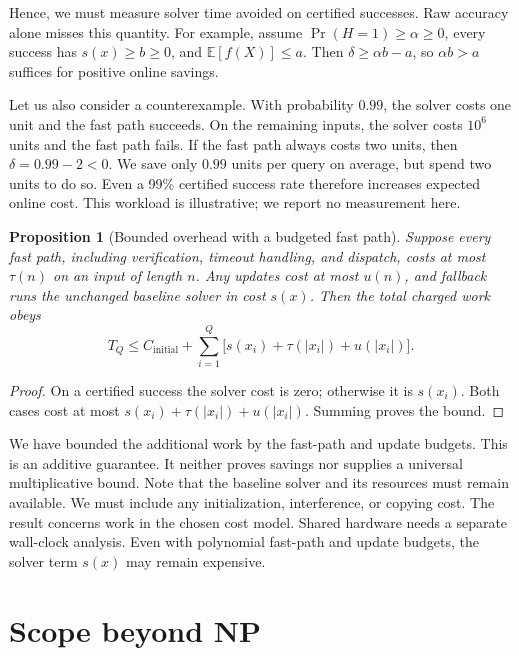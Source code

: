 \documentclass[11pt,a4paper]{article}
\numberwithin{equation}{section}
\newcommand{\E}{\mathbb{E}}
\DeclareMathOperator{\Prb}{Pr}
\theoremstyle{plain}
\newtheorem{proposition}[lemma]{Proposition}
\theoremstyle{definition}
\theoremstyle{remark}
\begin{document}
Hence, we must measure solver time avoided on certified successes. Raw accuracy alone misses this quantity. For example, assume $\Prb(H=1)\geq\alpha\geq0$, every success has $s(x)\geq b\geq0$, and $\E[f(X)]\leq a$. Then $\delta\geq\alpha b-a$, so $\alpha b>a$ suffices for positive online savings.

Let us also consider a counterexample. With probability $0.99$, the solver costs one unit and the fast path succeeds. On the remaining inputs, the solver costs $10^6$ units and the fast path fails. If the fast path always costs two units, then $\delta=0.99-2<0$. We save only $0.99$ units per query on average, but spend two units to do so. Even a 99\% certified success rate therefore increases expected online cost. This workload is illustrative; we report no measurement here.

\begin{proposition}[Bounded overhead with a budgeted fast path]
\label{prop:overhead}
Suppose every fast path, including verification, timeout handling, and dispatch, costs at most $\tau(n)$ on an input of length $n$. Any updates cost at most $u(n)$, and fallback runs the unchanged baseline solver in cost $s(x)$. Then the total charged work obeys
\begin{equation}
T_Q\leq C_{\mathrm{initial}}+
\sum_{i=1}^Q\bigl[s(x_i)+\tau(|x_i|)+u(|x_i|)\bigr].
\label{eq:overhead}
\end{equation}
\end{proposition}

\begin{proof}
On a certified success the solver cost is zero; otherwise it is $s(x_i)$. Both cases cost at most $s(x_i)+\tau(|x_i|)+u(|x_i|)$. Summing proves the bound.
\end{proof}

We have bounded the additional work by the fast-path and update budgets. This is an additive guarantee. It neither proves savings nor supplies a universal multiplicative bound. Note that the baseline solver and its resources must remain available. We must include any initialization, interference, or copying cost. The result concerns work in the chosen cost model. Shared hardware needs a separate wall-clock analysis. Even with polynomial fast-path and update budgets, the solver term $s(x)$ may remain expensive.

\section{Scope beyond NP}
\label{sec:beyond-np}
\end{document}
